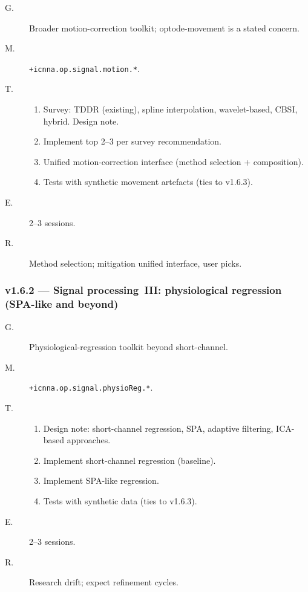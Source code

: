 \documentclass[11pt,a4paper]{article}
\begin{document}
\begin{description}
    \item[G.] Broader motion-correction toolkit; optode-movement is a stated concern.
    \item[M.] \texttt{+icnna.op.signal.motion.*}.
    \item[T.]
        \begin{enumerate}[nosep]
            \item Survey: TDDR (existing), spline interpolation, wavelet-based, CBSI, hybrid. Design note.
            \item Implement top 2--3 per survey recommendation.
            \item Unified motion-correction interface (method selection + composition).
            \item Tests with synthetic movement artefacts (ties to v1.6.3).
        \end{enumerate}
    \item[E.] 2--3 sessions.
    \item[R.] Method selection; mitigation unified interface, user picks.
\end{description}

\subsubsection*{v1.6.2 --- Signal processing~III: physiological regression (SPA-like and beyond)}

\begin{description}
    \item[G.] Physiological-regression toolkit beyond short-channel.
    \item[M.] \texttt{+icnna.op.signal.physioReg.*}.
    \item[T.]
        \begin{enumerate}[nosep]
            \item Design note: short-channel regression, SPA, adaptive filtering, ICA-based approaches.
            \item Implement short-channel regression (baseline).
            \item Implement SPA-like regression.
            \item Tests with synthetic data (ties to v1.6.3).
        \end{enumerate}
    \item[E.] 2--3 sessions.
    \item[R.] Research drift; expect refinement cycles.
\end{description}
\end{document}
